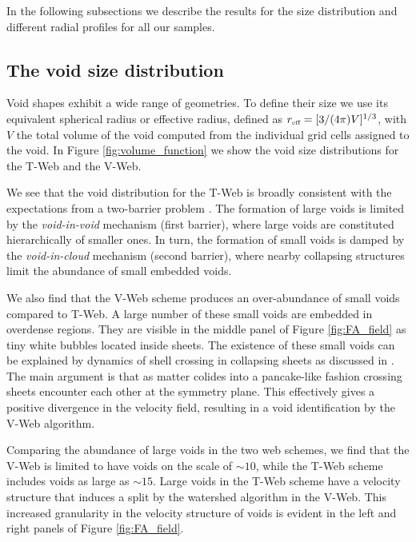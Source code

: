 \documentclass[a4,useAMS,usenatbib,usegraphicx]{mn2e}
\newcommand{\hMpc}{{\ifmmode{h^{-1}{\rm Mpc}}\else{$h^{-1}$Mpc}\fi}}
\newcommand{\reff}{{\ifmmode{r_{\mbox{\tiny eff}}}\else{$r_{\mbox{\tiny eff}}$}\fi}}
\begin{document}
In the following subsections we describe the results for the size
distribution and different radial profiles for all our samples.

\subsection{The void size distribution}
\label{subsec:shape_voids}

Void shapes exhibit a wide range of geometries.
To define their size we use its equivalent spherical radius or
effective radius, defined as $\reff = [3/(4\pi)V]^{1/3}$, with $V$ the 
total volume of the void computed from the individual grid cells
assigned to the void.   
In Figure \ref{fig:volume_function} we show the void size
distributions for the T-Web and the V-Web.

We see that the void distribution for the T-Web is broadly consistent with the
expectations from a two-barrier problem  \citep{Sheth04}. 
The formation of large voids is limited by the \textit{void-in-void}
mechanism (first barrier), where large voids are constituted
hierarchically of smaller ones. 
In turn, the formation of small voids is damped by the
\textit{void-in-cloud} mechanism (second barrier),  where nearby
collapsing structures limit the abundance of small embedded voids.  

We also find that the V-Web scheme produces an over-abundance of small
voids compared to T-Web.
A large number of these small voids are embedded in overdense regions. 
They are visible in the middle panel of Figure \ref{fig:FA_field} as
tiny white bubbles located inside sheets.
The existence of these small voids can be explained by
dynamics of shell crossing in collapsing sheets as discussed in
\citet{Hoffman12}.    
The main argument is that as matter colides into a pancake-like
fashion crossing sheets encounter each other at the symmetry plane.
This effectively gives a positive divergence in the velocity
field, resulting in a void identification by the V-Web algorithm. 


Comparing the abundance of large voids in the two web schemes, we find
that the V-Web is limited to have voids on the scale of $\sim 10$\hMpc,
while the T-Web scheme includes voids as large as $\sim 15$\hMpc. 
Large voids in the T-Web scheme have a velocity structure that
induces a split by the watershed algorithm in the V-Web. 
This increased granularity in the velocity structure of voids is
evident in the left and right panels of Figure \ref{fig:FA_field}. 
\end{document}
